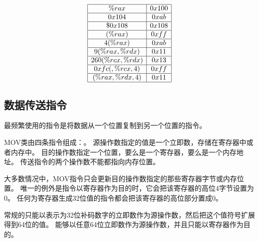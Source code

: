 {{        %
        \begin{practicec}
            \begin{table}[H]
                \[
                    \begin{array}{|c|c|}
                        \hline
                        \%rax & 0x100 \\
                        \hline
                        0x104 & 0xab \\
                        \hline
                        \$0x108 & 0x108 \\
                        \hline
                        (\%rax) & 0xff \\
                        \hline
                        4(\%rax) & 0xab \\
                        \hline
                        9(\%rax, \%rdx) & 0x11 \\
                        \hline
                        260(\%rcx, \%rdx) & 0x13 \\
                        \hline
                        0xfc(, \%rcx, 4) & 0xff \\
                        \hline
                        (\%rax, \%rdx, 4) & 0x11 \\
                        \hline
                    \end{array}
                \]
            \end{table}
        \end{practicec}
    }

    \subsection{数据传送指令}
    {
        最频繁使用的指令是将数据从一个位置复制到另一个位置的指令。

        MOV类由四条指令组成：。
        源操作数指定的值是一个立即数，存储在寄存器中或者内存中。
        目的操作数指定一个位置，要么是一个寄存器，要么是一个内存地址。
        传送指令的两个操作数不能都指向内存位置。

        大多数情况中，MOV指令只会更新目的操作数指定的那些寄存器字节或内存位置。
        唯一的例外是指令以寄存器作为目的时，它会把该寄存器的高位4字节设置为0。
        任何为寄存器生成32位值的指令都会把该寄存器的高位部分置成0。

        常规的只能以表示为32位补码数字的立即数作为源操作数，然后把这个值符号扩展得到64位的值。
        能够以任意64位立即数作为源操作数，并且只能以寄存器作为目的。

}}
